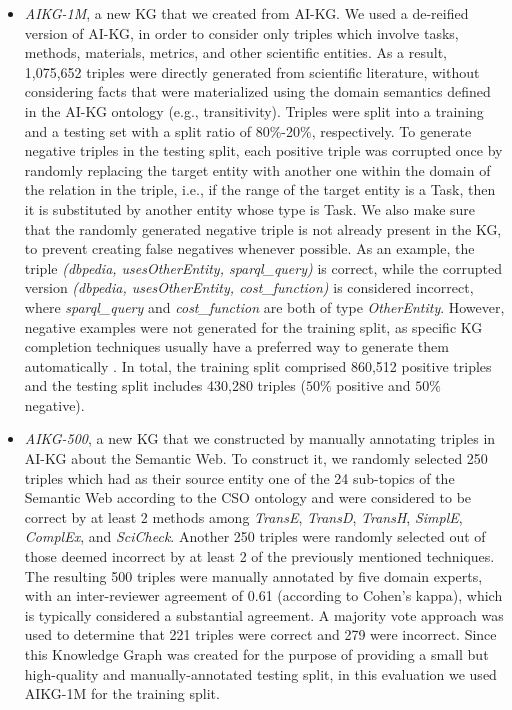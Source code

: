 \begin{itemize}
    \item \textit{AIKG-1M}, a new KG that we created from AI-KG. We used a de-reified version of AI-KG, in order to consider only triples which involve tasks, methods, materials, metrics, and other scientific entities. As a result, 1,075,652 triples were directly generated from scientific literature, without considering facts that were materialized using the domain semantics defined in the AI-KG ontology (e.g., transitivity). Triples were split into a training and a testing set with a split ratio of 80\%-20\%, respectively.
    To generate negative triples in the testing split, each positive triple was corrupted once by randomly replacing the target entity with another one within the domain of the relation in the triple, i.e., if the range of the target entity is a Task, then it is substituted by another entity whose type is Task. We also make sure that the randomly generated negative triple is not already present in the KG, to prevent creating false negatives whenever possible. As an example, the triple \textit{(dbpedia, usesOtherEntity, sparql\_query)} is correct, while the corrupted version \textit{(dbpedia, usesOtherEntity, cost\_function)} is considered incorrect, where \textit{sparql\_query} and \textit{cost\_function} are both of type \textit{OtherEntity}. However, negative examples were not generated for the training split, as specific KG completion techniques usually have a preferred way to generate them automatically \cite{borrego2019}. In total, the training split comprised 860,512 positive triples and the testing split includes 430,280 triples ($50\%$ positive and $50\%$ negative).\\

    \item \textit{AIKG-500}, a new KG that we constructed by manually annotating triples in AI-KG about the Semantic Web. 
    To construct it, we randomly selected 250 triples which had as their source entity one of the 24 sub-topics of the Semantic Web according to the CSO ontology \cite{salatino2020CSO} and were considered to be correct by at least 2 methods among \textit{TransE}, \textit{TransD}, \textit{TransH}, \textit{SimplE}, \textit{ComplEx}, and \textit{SciCheck}. Another 250 triples were randomly selected out of those deemed incorrect by at least 2 of the previously mentioned techniques. The resulting 500 triples were manually annotated by five domain experts, with an inter-reviewer agreement of 0.61 (according to Cohen's kappa), which is typically considered a substantial agreement.
    A majority vote approach was used to determine that 221 triples were correct and 279 were incorrect. Since this Knowledge Graph was created for the purpose of providing a small but high-quality and  manually-annotated testing split, in this evaluation we used AIKG-1M for the training split.\\


\end{itemize}
